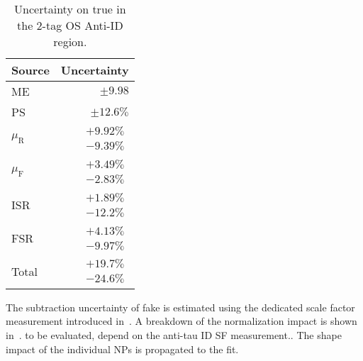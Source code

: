 \begin{table}[htbp]
  \centering
  \begin{tabular}{lr}
    \toprule
    Source & Uncertainty \\
    \midrule
    ME & $\pm 9.98$ \\[0.3em]
    PS & $\pm 12.6 \%$ \\[0.3em]
    $\mu_\text{R}$ & $\substack{+9.92 \% \\ -9.39 \%}$ \\[0.3em]
    $\mu_\text{F}$ & $\substack{+3.49 \% \\ -2.83 \%}$ \\[0.3em]
    ISR & $\substack{+1.89 \% \\ -12.2 \%}$ \\[0.3em]
    FSR & $\substack{+4.13 \% \\ -9.97 \%}$ \\
    \midrule
    Total & $\substack{+19.7 \% \\ -24.6 \%}$ \\
    \bottomrule
  \end{tabular}
  \caption{Uncertainty on true \tauhad \ttbar in the 2-tag OS Anti-ID region.}
  \label{tab:LQ_systematics_multijet_hh_ttbar_subtraction}
\end{table}

The subtraction uncertainty of fake \tauhad \ttbar is estimated using the dedicated scale factor measurement introduced in~.
A breakdown of the normalization impact is shown in~. {\color{red} to be evaluated, depend on the anti-tau ID SF measurement.}.
The shape impact of the individual NPs is propagated to the fit.

